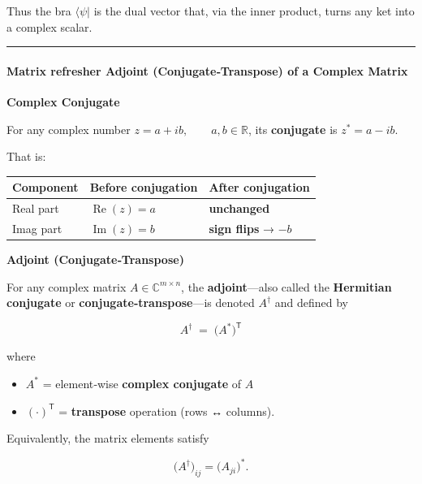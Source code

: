 Thus the bra \(\langle\psi|\) is the dual vector that, via the inner
product, turns any ket into a complex scalar.

\begin{center}\rule{0.5\linewidth}{0.5pt}\end{center}

\hypertarget{matrix-refresher-adjoint-conjugatetranspose-of-a-complex-matrix}{%
\paragraph{Matrix refresher Adjoint (Conjugate‑Transpose) of a Complex
Matrix}\label{matrix-refresher-adjoint-conjugatetranspose-of-a-complex-matrix}}

\textbf{Complex Conjugate}

For any complex number \(z = a + ib , \qquad a,b\in\mathbb R\), its
\textbf{conjugate} is \(z^{*} = a - ib\).

That is:

\begin{longtable}[]{@{}lll@{}}
\toprule\noalign{}
Component & Before conjugation & After conjugation \\
\midrule\noalign{}
\endhead
\bottomrule\noalign{}
\endlastfoot
Real part &  \( \operatorname{Re}(z)=a  \) & \textbf{unchanged} \\
Imag part &  \( \operatorname{Im}(z)=b  \) & \textbf{sign flips} →
\(-b\) \\
\end{longtable}

\textbf{Adjoint (Conjugate‑Transpose)}

For any complex matrix \(A \in \mathbb{C}^{m\times n}\), the
\textbf{adjoint}---also called the \textbf{Hermitian conjugate} or
\textbf{conjugate‑transpose}---is denoted \(A^{\dagger}\) and defined by

\[
\boxed{\;
A^{\dagger} \;=\; \bigl(A^{*}\bigr)^{\mathsf T}
\;}
\]

where

\begin{itemize}
\tightlist
\item
  \(A^{*}\) = element‑wise \textbf{complex conjugate} of \(A\)\\
\item
  \((\cdot)^{\mathsf T}\) = \textbf{transpose} operation (rows ↔
  columns).
\end{itemize}

Equivalently, the matrix elements satisfy

\[
\bigl(A^{\dagger}\bigr)_{ij} = \bigl(A_{ji}\bigr)^{*}.
\]

